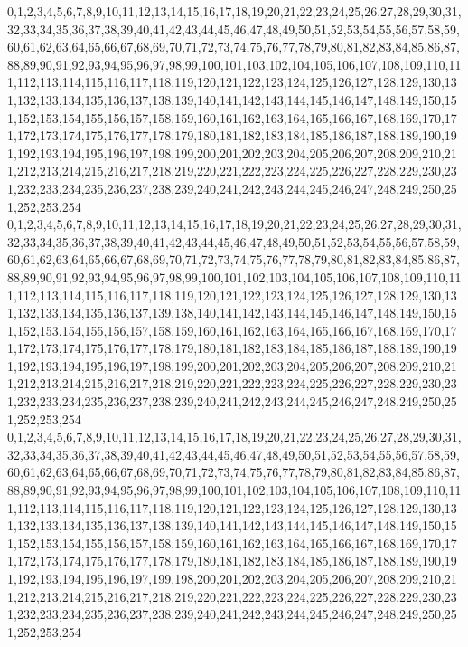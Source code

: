 \documentclass[12pt]{article}
\begin{document}
{0,1,2,3,4,5,6,7,8,9,10,11,12,13,14,15,16,17,18,19,20,21,22,23,24,25,26,27,28,29,30,31,32,33,34,35,36,37,38,39,40,41,42,43,44,45,46,47,48,49,50,51,52,53,54,55,56,57,58,59,60,61,62,63,64,65,66,67,68,69,70,71,72,73,74,75,76,77,78,79,80,81,82,83,84,85,86,87,88,89,90,91,92,93,94,95,96,97,98,99,100,101,103,102,104,105,106,107,108,109,110,111,112,113,114,115,116,117,118,119,120,121,122,123,124,125,126,127,128,129,130,131,132,133,134,135,136,137,138,139,140,141,142,143,144,145,146,147,148,149,150,151,152,153,154,155,156,157,158,159,160,161,162,163,164,165,166,167,168,169,170,171,172,173,174,175,176,177,178,179,180,181,182,183,184,185,186,187,188,189,190,191,192,193,194,195,196,197,198,199,200,201,202,203,204,205,206,207,208,209,210,211,212,213,214,215,216,217,218,219,220,221,222,223,224,225,226,227,228,229,230,231,232,233,234,235,236,237,238,239,240,241,242,243,244,245,246,247,248,249,250,251,252,253,254\\
0,1,2,3,4,5,6,7,8,9,10,11,12,13,14,15,16,17,18,19,20,21,22,23,24,25,26,27,28,29,30,31,32,33,34,35,36,37,38,39,40,41,42,43,44,45,46,47,48,49,50,51,52,53,54,55,56,57,58,59,60,61,62,63,64,65,66,67,68,69,70,71,72,73,74,75,76,77,78,79,80,81,82,83,84,85,86,87,88,89,90,91,92,93,94,95,96,97,98,99,100,101,102,103,104,105,106,107,108,109,110,111,112,113,114,115,116,117,118,119,120,121,122,123,124,125,126,127,128,129,130,131,132,133,134,135,136,137,139,138,140,141,142,143,144,145,146,147,148,149,150,151,152,153,154,155,156,157,158,159,160,161,162,163,164,165,166,167,168,169,170,171,172,173,174,175,176,177,178,179,180,181,182,183,184,185,186,187,188,189,190,191,192,193,194,195,196,197,198,199,200,201,202,203,204,205,206,207,208,209,210,211,212,213,214,215,216,217,218,219,220,221,222,223,224,225,226,227,228,229,230,231,232,233,234,235,236,237,238,239,240,241,242,243,244,245,246,247,248,249,250,251,252,253,254\\
0,1,2,3,4,5,6,7,8,9,10,11,12,13,14,15,16,17,18,19,20,21,22,23,24,25,26,27,28,29,30,31,32,33,34,35,36,37,38,39,40,41,42,43,44,45,46,47,48,49,50,51,52,53,54,55,56,57,58,59,60,61,62,63,64,65,66,67,68,69,70,71,72,73,74,75,76,77,78,79,80,81,82,83,84,85,86,87,88,89,90,91,92,93,94,95,96,97,98,99,100,101,102,103,104,105,106,107,108,109,110,111,112,113,114,115,116,117,118,119,120,121,122,123,124,125,126,127,128,129,130,131,132,133,134,135,136,137,138,139,140,141,142,143,144,145,146,147,148,149,150,151,152,153,154,155,156,157,158,159,160,161,162,163,164,165,166,167,168,169,170,171,172,173,174,175,176,177,178,179,180,181,182,183,184,185,186,187,188,189,190,191,192,193,194,195,196,197,199,198,200,201,202,203,204,205,206,207,208,209,210,211,212,213,214,215,216,217,218,219,220,221,222,223,224,225,226,227,228,229,230,231,232,233,234,235,236,237,238,239,240,241,242,243,244,245,246,247,248,249,250,251,252,253,254\\
}
\end{document}
